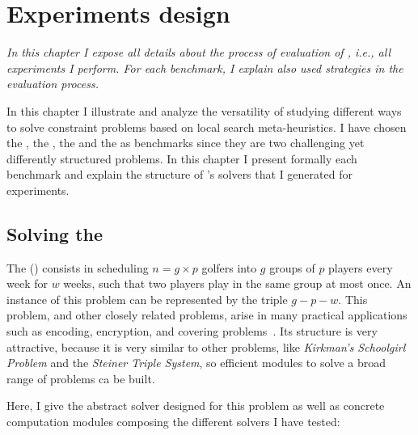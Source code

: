 \chapter{Experiments design}
\label{chap:expe}
\textit{In this chapter I expose all details about the process of evaluation of \posl{}, i.e., all experiments I perform. For each benchmark, I explain also used strategies in the evaluation process.}
\vfill
\minitoc
\newpage

In this chapter I illustrate and analyze the versatility of \posl{} studying different ways to solve constraint problems based on local search meta-heuristics. 
I have chosen the \sgp, the \nqp, the \carrp{} and the \grp{} as benchmarks since they are two challenging yet differently structured problems. In this chapter I present formally each benchmark and explain the structure of \posl's solvers that I generated for experiments.


\section{Solving the \sgp}
\label{sec:golfers}

The \sgp{} (\SGP) consists in scheduling $n=g\times p$ golfers into $g$ groups of $p$ players every week for $w$ weeks, such that two players play in the same group at most once. An instance of this problem can be represented by the triple $g-p-w$. This problem, and other closely related problems, arise in many practical applications such as encoding, encryption, and covering problems~\cite{Lardeux2014}. Its structure is very attractive, because it is very similar to other problems, like \textit{Kirkman's Schoolgirl Problem} and the \textit{Steiner Triple System}, so efficient modules to solve a broad range of problems ca be built.

Here, I give the abstract solver designed for this problem as well as concrete computation modules composing the different solvers I have tested:

